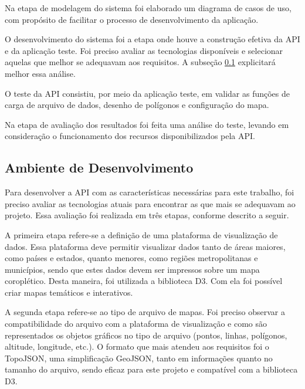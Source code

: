 \documentclass[12pt]{article}
\begin{document}
Na etapa de modelagem do sistema foi elaborado um diagrama de casos de uso, com propósito de facilitar o processo de desenvolvimento da aplicação.

O desenvolvimento do sistema foi a etapa onde houve a construção efetiva da API e da aplicação teste. Foi preciso avaliar as tecnologias disponíveis e selecionar aquelas que melhor se adequavam aos requisitos. A subseção \ref{tecnologias} explicitará melhor essa análise.

O teste da API consistiu, por meio da aplicação teste, em validar as funções de carga de arquivo de dados, desenho de polígonos e configuração do mapa.


Na etapa de avaliação dos resultados foi feita uma análise do teste, levando em consideração o funcionamento dos recursos disponibilizados pela API.

\subsection{Ambiente de Desenvolvimento} \label{tecnologias}

Para desenvolver a API com as características necessárias para este trabalho, foi preciso avaliar as tecnologias atuais para encontrar as que mais se adequavam ao projeto. Essa avaliação foi realizada em três etapas, conforme descrito a seguir.

A primeira etapa refere-se a definição de uma plataforma de visualização de dados. Essa plataforma deve permitir visualizar dados tanto de áreas maiores, como países e estados, quanto menores, como regiões metropolitanas e municípios, sendo que estes dados devem ser impressos sobre um mapa coroplético. Desta maneira, foi utilizada a biblioteca D3. Com ela foi possível criar mapas temáticos e interativos.

A segunda etapa refere-se ao tipo de arquivo de mapas. Foi preciso observar a compatibilidade do arquivo com a plataforma de visualização e como são representados os objetos gráficos no tipo de arquivo (pontos, linhas, polígonos, altitude, longitude, etc.). O formato que mais atendeu aos requisitos foi o TopoJSON, uma simplificação GeoJSON, tanto em informações quanto no tamanho do arquivo, sendo eficaz para este projeto e compatível com a biblioteca D3. %
\end{document}
